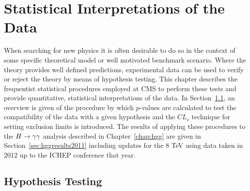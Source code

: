 \chapter{Statistical Interpretations of the Data}
\label{chap:statistics}

When searching for new physics it is often desirable to do so in the context of
some specific theoretical model or well motivated benchmark scenario.
Where the theory provides well defined predictions,
experimental data can be used to verify or reject the theory
by means of hypothesis testing. This chapter describes the frequentist statistical procedures 
employed at CMS to perform these tests and provide quantitative, statistical interpretations  
of the data. In Section~\ref{sec:hypothesistesting}, an overview is given of the procedure by 
which $p$-values are calculated to test the compatibility of the data with a given 
hypothesis and the $CL_{s}$ technique for setting exclusion limits is introduced. 
The results of applying these procedures to the $H\rightarrow\gamma\gamma$ analysis described in Chapter~\ref{chap:hgg} 
are given in Section~\ref{sec:hggresults2011} including updates for the 8 TeV using data taken 
in 2012 up to the ICHEP conference that year.


\section{Hypothesis Testing}
\label{sec:hypothesistesting}

